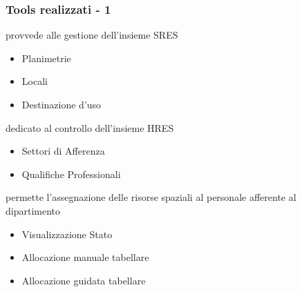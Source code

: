 
\begin{frame}
\frametitle{Tools realizzati - 1}
\begin{block}{}
\begin{description}
\item [Risorse Spaziali] provvede alle gestione dell'insieme SRES
\begin{itemize}
\item Planimetrie
\item Locali
\item Destinazione d'uso
\end{itemize}
\item [Risorse Umane] dedicato al controllo dell'insieme HRES
\begin{itemize}
\item Settori di Afferenza
\item Qualifiche Professionali
\end{itemize}
\item [Allocatore] permette l'assegnazione delle risorse spaziali
al personale afferente al dipartimento
\begin{itemize}
\item Visualizzazione Stato
\item Allocazione manuale tabellare
\item Allocazione guidata tabellare
\end{itemize}
\end{description}
\end{block}
\end{frame}



